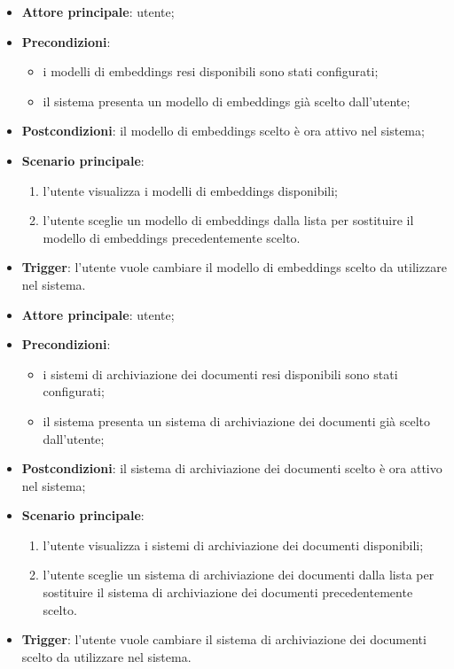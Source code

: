 \documentclass[10pt, a4paper]{article}
\begin{document}
    \begin{itemize}
        \item \textbf{Attore principale}: utente;
        \item \textbf{Precondizioni}: 
        \begin{itemize}
            \item i modelli di embeddings resi disponibili sono stati configurati;
            \item il sistema presenta un modello di embeddings già scelto dall'utente;
        \end{itemize}
        \item \textbf{Postcondizioni}: il modello di embeddings scelto è ora attivo nel sistema;
        \item \textbf{Scenario principale}:
            \begin{enumerate}
                \item l’utente visualizza i modelli di embeddings disponibili;
                \item l’utente sceglie un modello di embeddings dalla lista per sostituire il modello di embeddings precedentemente scelto.
            \end{enumerate}
        \item \textbf{Trigger}: l’utente vuole cambiare il modello di embeddings scelto da utilizzare nel sistema.
    \end{itemize}

    \begin{itemize}
        \item \textbf{Attore principale}: utente;
        \item \textbf{Precondizioni}: 
        \begin{itemize}
            \item i sistemi di archiviazione dei documenti resi disponibili sono stati configurati;
            \item il sistema presenta un sistema di archiviazione dei documenti già scelto dall'utente;
        \end{itemize}
        \item \textbf{Postcondizioni}: il sistema di archiviazione dei documenti scelto è ora attivo nel sistema;
        \item \textbf{Scenario principale}:
            \begin{enumerate}
                \item l’utente visualizza i sistemi di archiviazione dei documenti disponibili;
                \item l’utente sceglie un sistema di archiviazione dei documenti dalla lista per sostituire il sistema di archiviazione dei documenti precedentemente scelto.
            \end{enumerate}
        \item \textbf{Trigger}: l’utente vuole cambiare il sistema di archiviazione dei documenti scelto da utilizzare nel sistema.
    \end{itemize}
\end{document}
